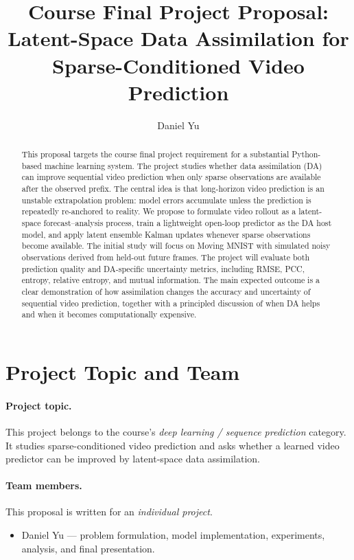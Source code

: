 \documentclass{article}
\title{Course Final Project Proposal: Latent-Space Data Assimilation for Sparse-Conditioned Video Prediction}
\author{Daniel Yu}
\begin{document}
\maketitle

\begin{abstract}
This proposal targets the course final project requirement for a substantial Python-based machine learning system. The project studies whether data assimilation (DA) can improve sequential video prediction when only sparse observations are available after the observed prefix. The central idea is that long-horizon video prediction is an unstable extrapolation problem: model errors accumulate unless the prediction is repeatedly re-anchored to reality. We propose to formulate video rollout as a latent-space forecast--analysis process, train a lightweight open-loop predictor as the DA host model, and apply latent ensemble Kalman updates whenever sparse observations become available. The initial study will focus on Moving MNIST with simulated noisy observations derived from held-out future frames. The project will evaluate both prediction quality and DA-specific uncertainty metrics, including RMSE, PCC, entropy, relative entropy, and mutual information. The main expected outcome is a clear demonstration of how assimilation changes the accuracy and uncertainty of sequential video prediction, together with a principled discussion of when DA helps and when it becomes computationally expensive.
\end{abstract}

\section{Project Topic and Team}

\paragraph{Project topic.}
This project belongs to the course's \emph{deep learning / sequence prediction} category. It studies sparse-conditioned video prediction and asks whether a learned video predictor can be improved by latent-space data assimilation.

\paragraph{Team members.}
This proposal is written for an \emph{individual project}.
\begin{itemize}[leftmargin=1.2em]
    \item Daniel Yu --- problem formulation, model implementation, experiments, analysis, and final presentation.
\end{itemize}
\end{document}

